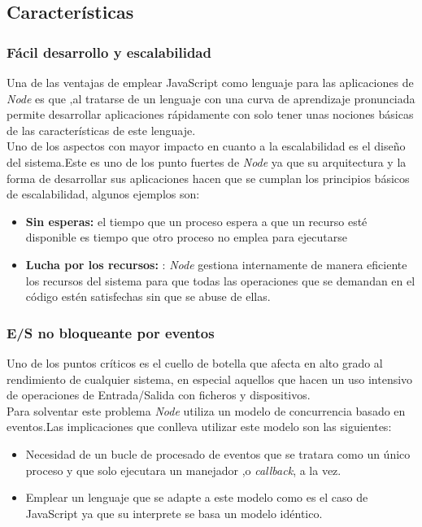 \subsection{Características}
\subsubsection*{Fácil desarrollo y escalabilidad}
Una de las ventajas de emplear JavaScript como lenguaje para las aplicaciones de \textit{Node} es que ,al tratarse de un lenguaje con una curva de aprendizaje pronunciada permite desarrollar aplicaciones rápidamente con solo tener unas nociones básicas de las características de este lenguaje.
\\Uno de los aspectos con mayor impacto en cuanto a la escalabilidad es el diseño del sistema.Este es uno de los punto fuertes de \textit{Node} ya que su arquitectura y la forma de desarrollar sus aplicaciones hacen que se cumplan los principios básicos de escalabilidad, algunos ejemplos son:
\begin{itemize}
\item \textbf{Sin esperas:} el tiempo que un proceso espera a que un recurso esté disponible es tiempo que otro proceso no emplea para ejecutarse
\item \textbf{Lucha por los recursos:} : \textit{Node} gestiona internamente de manera eficiente los recursos del sistema para que todas las operaciones que se demandan en el código estén satisfechas sin que se abuse de ellas.
\end{itemize}
\subsubsection*{E/S no bloqueante por eventos}
Uno de los puntos críticos es el cuello de botella que afecta en alto grado al rendimiento de cualquier sistema, en especial aquellos que hacen un uso intensivo de operaciones de Entrada/Salida con ficheros y dispositivos.
\\Para solventar este problema \textit{Node} utiliza un modelo de concurrencia basado en eventos.Las implicaciones que conlleva utilizar este modelo son las siguientes:
\begin{itemize}
\item Necesidad de un bucle de procesado de eventos que se tratara como un único proceso y que solo ejecutara un manejador ,o \textit{callback}, a la vez.
\item  Emplear un lenguaje que se adapte a este modelo como es el caso de JavaScript ya que su interprete se basa un modelo idéntico.
\end{itemize}
